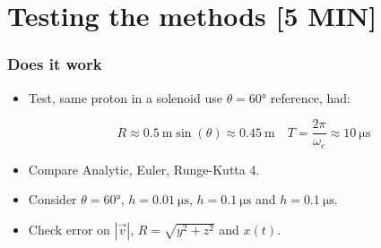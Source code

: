\documentclass{beamer}
\begin{document}
\section{Testing the methods [5 MIN]}

\begin{frame}
\frametitle{Does it work}
\begin{itemize}

\item<1-> Test, same proton in a solenoid use $\theta=\ang{60}$ reference, had:

\begin{equation*}
R \approx \SI{0.5}{\meter}\sin(\theta)\approx \SI{0.45}{\meter} \quad T=\frac{2\pi}{\omega_c} \approx \SI{10}{\micro\second}
\end{equation*}

\item<2-> Compare Analytic, Euler, Runge-Kutta 4.

\item<3-> Consider $\theta=\ang{60}$, $h=\SI{0.01}{\micro\second}$, $h=\SI{0.1}{\micro\second}$ and  $h=\SI{0.1}{\micro\second}$.

\item<4-> Check error on $|\vec{v}|$, $R=\sqrt{y^2+z^2}$ and $x(t)$.
\end{itemize}
\end{frame}


\makeatletter
{}
\makeatother
\end{document}
